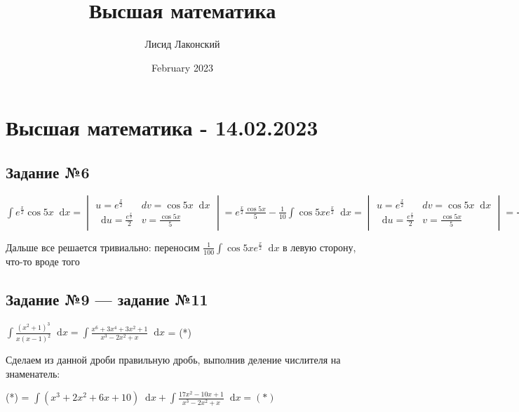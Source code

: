 \documentclass{article}
\title{Высшая математика}
\author{Лисид Лаконский}
\date{February 2023}
\newcommand*\diff{\mathop{}\!\mathrm{d}}
\begin{document}
\raggedright

\maketitle

\tableofcontents
\pagebreak

\section{Высшая математика - 14.02.2023}

\subsection{Задание №6}

$\int e^{\frac{x}{2}} \cos 5 x \diff x = \begin{vmatrix}
    u = e^{\frac{x}{2}} & dv = \cos 5 x \diff x \\
    \diff u = \frac{e^{\frac{x}{2}}}{2} & v = \frac{\cos 5 x}{5}
\end{vmatrix} = e^{\frac{x}{2}} \frac{\cos 5 x}{5} - \frac{1}{10} \int \cos 5 x e^{\frac{x}{2}} \diff x = \begin{vmatrix}
    u = e^{\frac{x}{2}} & dv = \cos 5 x \diff x \\
    \diff u = \frac{e^{\frac{x}{2}}}{2} & v = \frac{\cos 5 x}{5}
\end{vmatrix} = \frac{\cos 5 x}{5} - \frac{1}{10} (\frac{e^{\frac{x}{2}} \cos 5 x}{5} - \frac{1}{10} \int \cos 5 x e^{\frac{x}{2}} \diff x) = \frac{\cos 5 x}{5} - \frac{e^{\frac{x}{2}} \cos 5 x}{50} + \frac{1}{100} \int \cos 5 x e^{\frac{x}{2}} \diff x$

\hfill

Дальше все решается тривиально: переносим $\frac{1}{100} \int \cos 5 x e^{\frac{x}{2}} \diff x$ в левую сторону, что-то вроде того

\subsection{Задание №9 — задание №11}

$\int \frac{(x^2 + 1)^3}{x(x - 1)^2} \diff x = \int \frac{x^6 + 3x^4 + 3x^2 + 1}{x^3 - 2 x^2 + x} \diff x$ = (*)

\hfill

Сделаем из данной дроби правильную дробь, выполнив деление числителя на знаменатель:

(*) = $\int (x^3 + 2x^2 + 6x + 10) \diff x + \int \frac{17x^2 - 10 x + 1}{x^3 - 2x^2 + x} \diff x = (*)$
\end{document}
